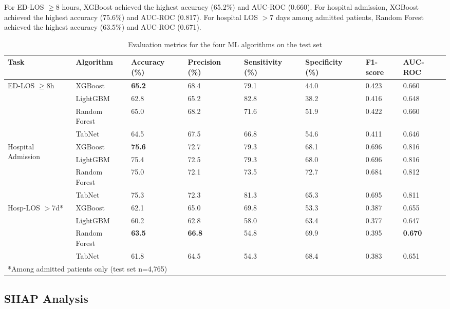 \documentclass[harvard,article]{frontiersinFPHY_FAMS}
\begin{document}
For ED-LOS $\geq$8 hours, XGBoost achieved the highest accuracy (65.2\%) and AUC-ROC (0.660). For hospital admission, XGBoost achieved the highest accuracy (75.6\%) and AUC-ROC (0.817). For hospital LOS $>$7 days among admitted patients, Random Forest achieved the highest accuracy (63.5\%) and AUC-ROC (0.671).

\begin{table}[H]
\centering
\caption{Evaluation metrics for the four ML algorithms on the test set}
\label{tab:results}
\begin{tabular}{p{3.2cm}p{2.0cm}p{1.7cm}p{1.7cm}p{1.7cm}p{1.7cm}p{1.2cm}p{1.2cm}}
\toprule
\textbf{Task} & \textbf{Algorithm} & \textbf{Accuracy (\%)} & \textbf{Precision (\%)} & \textbf{Sensitivity (\%)} & \textbf{Specificity (\%)} & \textbf{F1-score} & \textbf{AUC-ROC} \\
\midrule
\multirow{4}{*}{ED-LOS $\geq$8h} & XGBoost & \textbf{65.2} & 68.4 & 79.1 & 44.0 & 0.423 & 0.660 \\
 & LightGBM & 62.8 & 65.2 & 82.8 & 38.2 & 0.416 & 0.648 \\
 & Random Forest & 65.0 & 68.2 & 71.6 & 51.9 & 0.422 & 0.660 \\
 & TabNet & 64.5 & 67.5 & 66.8 & 54.6 & 0.411 & 0.646 \\
\midrule
\multirow{4}{*}{Hospital Admission} & XGBoost & \textbf{75.6} & 72.7 & 79.3 & 68.1 & 0.696 & 0.816 \\
 & LightGBM & 75.4 & 72.5 & 79.3 & 68.0 & 0.696 & 0.816 \\
 & Random Forest & 75.0 & 72.1 & 73.5 & 72.7 & 0.684 & 0.812 \\
 & TabNet & 75.3 & 72.3 & 81.3 & 65.3 & 0.695 & 0.811 \\
\midrule
\multirow{4}{*}{Hosp-LOS $>$7d*} & XGBoost & 62.1 & 65.0 & 69.8 & 53.3 & 0.387 & 0.655 \\
 & LightGBM & 60.2 & 62.8 & 58.0 & 63.4 & 0.377 & 0.647 \\
 & Random Forest & \textbf{63.5} & \textbf{66.8} & 54.8 & 69.9 & 0.395 & \textbf{0.670} \\
 & TabNet & 61.8 & 64.5 & 54.3 & 68.4 & 0.383 & 0.651 \\
\bottomrule
\multicolumn{8}{p{12cm}}{*Among admitted patients only (test set n=4,765)} \\
\end{tabular}
\end{table}

\subsection{SHAP Analysis}
\end{document}
